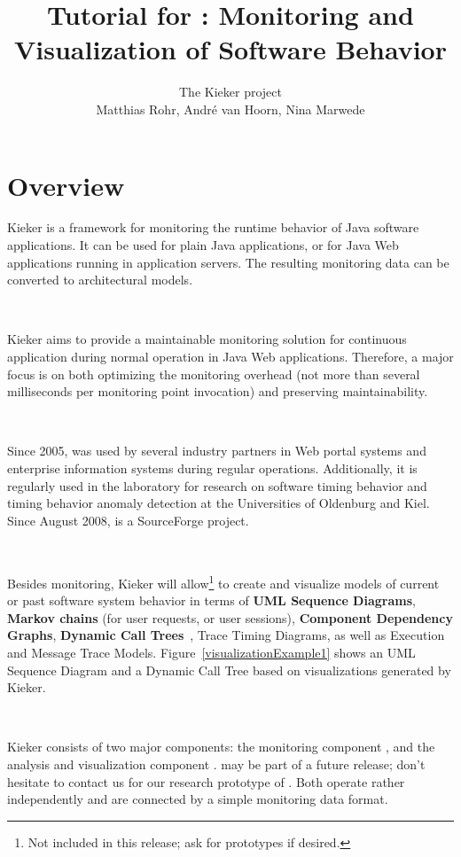 \documentclass[a4paper,12pt]{scrartcl}
\title{Tutorial for \kieker{}: Monitoring and Visualization of Software Behavior}
\author{The Kieker project \\ Matthias Rohr, Andr\'{e} van Hoorn, Nina Marwede}
\begin{document}
\maketitle
\tableofcontents
\section{Overview}

Kieker is a framework for monitoring the runtime behavior of Java software applications. It can be used for plain Java applications, or for Java Web applications running in application servers. The resulting monitoring data can be converted to architectural models.

\

Kieker aims to provide a maintainable monitoring solution for continuous application during normal operation in Java Web applications. Therefore, a major focus is on both optimizing the monitoring overhead (not more than several milliseconds per monitoring point invocation) and preserving maintainability.

\

Since 2005, \tpmon{} was used by several industry partners in Web portal systems and enterprise information systems during regular operations. Additionally, it is regularly used in the laboratory for research on software timing behavior and timing behavior anomaly detection at the Universities of Oldenburg and Kiel. Since August 2008, \tpmon{} is a SourceForge project.

\

Besides monitoring, Kieker will allow\footnote{Not included in this release; ask for prototypes if desired.} to create and visualize models of current or past software system behavior in terms of \textbf{UML Sequence Diagrams}, \textbf{Markov chains} (for user requests, or user sessions), \textbf{Component Dependency Graphs}, \textbf{Dynamic Call Trees}~\citep{AmmonsBallLarus97ExploitingHardwarePerformanceCountersWithFlowAndContextSensitiveProfiling}, Trace Timing Diagrams, as well as Execution and Message Trace Models. Figure~\ref{visualizationExample1} shows an UML Sequence Diagram and a Dynamic Call Tree based on visualizations generated by Kieker.

\

Kieker consists of two major components: the monitoring component \textbf{\tpmon{}}, and the analysis and visualization component \textbf{\tpan{}}. \tpan{} may be part of a future release; don't hesitate to contact us for our research prototype of \tpan{}. Both operate rather independently and are connected by a simple monitoring data format. %
\end{document}
